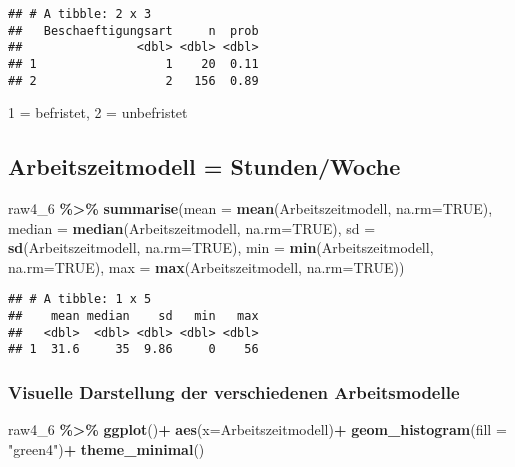 \documentclass[
]{article}
\newenvironment{Shaded}{\begin{snugshade}}{\end{snugshade}}
\newcommand{\AttributeTok}[1]{\textcolor[rgb]{0.13,0.29,0.53}{#1}}
\newcommand{\ConstantTok}[1]{\textcolor[rgb]{0.56,0.35,0.01}{#1}}
\newcommand{\FunctionTok}[1]{\textcolor[rgb]{0.13,0.29,0.53}{\textbf{#1}}}
\newcommand{\NormalTok}[1]{#1}
\newcommand{\SpecialCharTok}[1]{\textcolor[rgb]{0.81,0.36,0.00}{\textbf{#1}}}
\newcommand{\StringTok}[1]{\textcolor[rgb]{0.31,0.60,0.02}{#1}}
\begin{document}
\begin{verbatim}
## # A tibble: 2 x 3
##   Beschaeftigungsart     n  prob
##                <dbl> <dbl> <dbl>
## 1                  1    20  0.11
## 2                  2   156  0.89
\end{verbatim}

1 = befristet, 2 = unbefristet

\subsection{Arbeitszeitmodell =
Stunden/Woche}\label{arbeitszeitmodell-stundenwoche}

\begin{Shaded}
\begin{Highlighting}[]
\NormalTok{raw4\_6 }\SpecialCharTok{\%\textgreater{}\%} 
  \FunctionTok{summarise}\NormalTok{(}\AttributeTok{mean =} \FunctionTok{mean}\NormalTok{(Arbeitszeitmodell, }\AttributeTok{na.rm=}\ConstantTok{TRUE}\NormalTok{),}
            \AttributeTok{median =} \FunctionTok{median}\NormalTok{(Arbeitszeitmodell, }\AttributeTok{na.rm=}\ConstantTok{TRUE}\NormalTok{),}
         \AttributeTok{sd =} \FunctionTok{sd}\NormalTok{(Arbeitszeitmodell, }\AttributeTok{na.rm=}\ConstantTok{TRUE}\NormalTok{),}
         \AttributeTok{min =} \FunctionTok{min}\NormalTok{(Arbeitszeitmodell, }\AttributeTok{na.rm=}\ConstantTok{TRUE}\NormalTok{),}
         \AttributeTok{max =} \FunctionTok{max}\NormalTok{(Arbeitszeitmodell, }\AttributeTok{na.rm=}\ConstantTok{TRUE}\NormalTok{))}
\end{Highlighting}
\end{Shaded}

\begin{verbatim}
## # A tibble: 1 x 5
##    mean median    sd   min   max
##   <dbl>  <dbl> <dbl> <dbl> <dbl>
## 1  31.6     35  9.86     0    56
\end{verbatim}

\subsubsection{Visuelle Darstellung der verschiedenen
Arbeitsmodelle}\label{visuelle-darstellung-der-verschiedenen-arbeitsmodelle}

\begin{Shaded}
\begin{Highlighting}[]
\NormalTok{raw4\_6 }\SpecialCharTok{\%\textgreater{}\%} 
  \FunctionTok{ggplot}\NormalTok{()}\SpecialCharTok{+}
  \FunctionTok{aes}\NormalTok{(}\AttributeTok{x=}\NormalTok{Arbeitszeitmodell)}\SpecialCharTok{+}
  \FunctionTok{geom\_histogram}\NormalTok{(}\AttributeTok{fill =} \StringTok{"green4"}\NormalTok{)}\SpecialCharTok{+}
  \FunctionTok{theme\_minimal}\NormalTok{()}
\end{Highlighting}
\end{Shaded}
\end{document}
